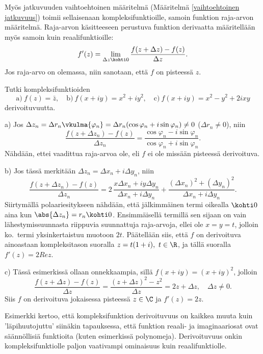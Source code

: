 Myös jatkuvuuden vaihtoehtoinen määritelmä (Määritelmä \ref{vaihtoehtoinen jatkuvuus})
toimii sellaisenaan kompleksifunktioille, samoin funktion raja-arvon määritelmä.
Raja-arvon käsitteeseen perustuva funktion derivaatta määritellään myös samoin kuin
reaalifunktioille:
\[ 
f'(z) = \lim_{\Delta z \kohti 0} \frac{f(z + \Delta z) - f(z)}{\Delta z}. 
\]
%
Jos raja-arvo on olemassa, niin sanotaan, että $f$ on  pisteessä $z$. 
\begin{Exa} \label{kompleksifunktioiden derivoituvuus} Tutki kompleksifunktioiden
\[ 
\text{a)}\ f(z) = \bar{z}, \quad \text{b)}\ f(x+iy) = x^2 + iy^2, \quad 
\text{c)}\ f(x+iy) = x^2-y^2 + 2ixy 
\]
derivoituvuutta. \end{Exa}
\ratk a) Jos $\Delta z_n = \Delta r_n\vkulma{\varphi_n}
= \Delta r_n(\cos\varphi_n + i\sin\varphi_n) \neq 0$ ($\Delta r_n \neq 0$), niin
\[ 
\frac{f(z + \Delta z_n) - f(z)}{\Delta z_n} 
             = \frac{\cos\varphi_n - i\sin\varphi_n}{\cos\varphi_n + i\sin\varphi_n}. 
\]
Nähdään, ettei vaadittua raja-arvoa ole, eli $f$ ei ole missään pisteessä derivoituva.

b) Jos tässä merkitään $\Delta z_n = \Delta x_n + i\Delta y_n$, niin
\[ 
\frac{f(z + \Delta z_n) - f(z)}{\Delta z_n} 
    = 2\,\frac{x\Delta x_n + iy\Delta y_n}{\Delta x_n + i\Delta y_n}
                           + \frac{(\Delta x_n)^2 + (\Delta y_n)^2}{\Delta x_n + i\Delta y_n}. 
\]
Siirtymällä polaariesitykseen nähdään, että jälkimmäinen termi oikealla $\kohti 0$ aina kun 
$\abs{\Delta z_n} = r_n \kohti 0$. Ensimmäisellä termillä sen sijaan on vain lähestymissuunnasta
riippuvia suunnattuja raja-arvoja, ellei ole $x=y=t$, jolloin ko.\ termi yksinkertaistuu muotoon
$2t$. Päätellään siis, että $f$ on derivoituva ainoastaan kompleksitason suoralla
$z = t(1+i),\ t \in \R$, ja tällä suoralla $f'(z) = 2Rez$. 

c) Tässä esimerkissä ollaan onnekkaampia, sillä $f(x+iy) = (x+iy)^2$, jolloin
\[ 
\frac{f(z + \Delta z) - f(z)}{\Delta z} = \frac{(z+\Delta z)^2 - z^2}{\Delta z} 
                                        = 2z + \Delta z, \quad \Delta z \neq 0. 
\]
Siis $f$ on derivoituva jokaisessa pisteessä $z \in \C$ ja $f'(z) = 2z$. \quad \loppu

Esimerkki kertoo, että kompleksifunktion derivoituvuus on kaikkea muuta kuin 'läpihuutojuttu'
siinäkin tapauksessa, että funktion reaali- ja imaginaariosat ovat säännöllisiä funktioita
(kuten esimerkissä polynomeja). Derivoituvuus onkin kom\-pleksifunktiolle paljon vaativampi
ominaisuus kuin reaalifunktiolle.

